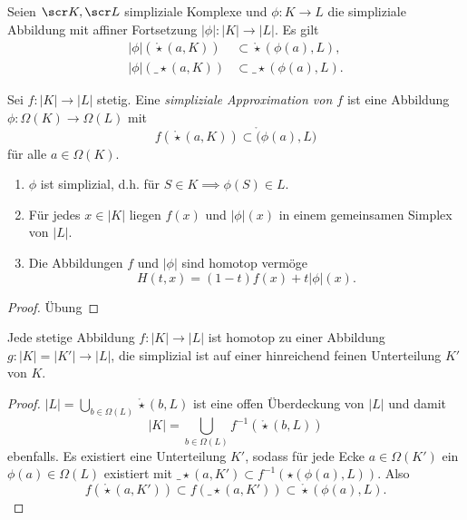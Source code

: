 \begin{nt}
	Seien $\scr K, \scr L$ simpliziale Komplexe und $\phi: K \to L$ die simpliziale Abbildung mit affiner Fortsetzung $|\phi|: |K| \to |L|$.
	Es gilt
	\begin{align*}
		|\phi|(\mathring \star(a, K)) &\subset \mathring \star (\phi(a), L), \\
		|\phi|(\_\star(a,K)) &\subset \_\star(\phi(a), L).
	\end{align*}
\end{nt}

\begin{df}
	Sei $f: |K| \to |L|$ stetig.
	Eine \emph{simpliziale Approximation von $f$} ist eine Abbildung $\phi: \Omega(K) \to \Omega(L)$ mit
	\[
		f(\mathring \star(a, K)) \subset \mathring(\phi(a), L)
	\]
	für alle $a \in \Omega(K)$.
\end{df}

\begin{lem}
	\begin{enumerate}[(1)]
		\item
			$\phi$ ist simplizial, d.h. für $S \in K \implies \phi(S) \in L$.
		\item
			Für jedes $x \in |K|$ liegen $f(x)$ und $|\phi|(x)$ in einem gemeinsamen Simplex von $|L|$.
		\item
			Die Abbildungen $f$ und $|\phi|$ sind homotop vermöge
			\[
				H(t, x) = (1 - t) f(x) + t |\phi|(x).
			\]
	\end{enumerate}
	\begin{proof}
		Übung
	\end{proof}
\end{lem}

\begin{st}
	Jede stetige Abbildung $f: |K| \to |L|$ ist homotop zu einer Abbildung $g: |K| = |K'| \to |L|$, die simplizial ist auf einer hinreichend feinen Unterteilung $K'$ von $K$.
	\begin{proof}
		$|L| = \bigcup_{b\in \Omega(L)} \mathring\star(b,L)$ ist eine offen Überdeckung von $|L|$ und damit
		\[
			|K| = \bigcup_{b\in\Omega(L)} f^{-1}(\mathring\star(b,L))
		\]
		ebenfalls.
		Es existiert eine Unterteilung $K'$, sodass für jede Ecke $a \in \Omega(K')$ ein $\phi(a) \in \Omega(L)$ existiert mit $\_\star(a, K') \subset f^{-1}(\star(\phi(a),L))$.
		Also
		\[
			f(\mathring \star(a,K'))
			\subset f(\_\star(a,K'))
			\subset \mathring\star(\phi(a),L).
		\]
	\end{proof}
\end{st}

